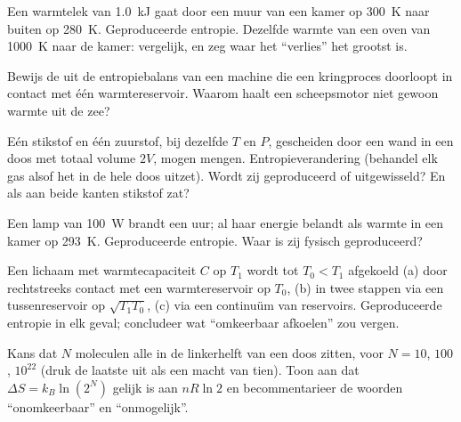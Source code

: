 \begin{exercise}[$\star\star$]\label{exo:b1:second-law-entropy:7}
Een warmtelek van \qty{1.0}{kJ} gaat door een muur van een kamer op \qty{300}{K} naar
buiten op \qty{280}{K}. Geproduceerde entropie. Dezelfde warmte van een oven
van \qty{1000}{K} naar de kamer: vergelijk, en zeg waar het ``verlies'' het
grootst is.
\end{exercise}

\begin{exercise}[$\star\star$]\label{exo:b1:second-law-entropy:8}
Bewijs de  uit de entropiebalans van een machine die een
kringproces doorloopt in contact met één warmtereservoir. Waarom haalt een scheepsmotor
niet gewoon warmte uit de zee?
\end{exercise}

\begin{exercise}[$\star\star$]\label{exo:b1:second-law-entropy:9}
Eén  stikstof en één  zuurstof, bij dezelfde $T$ en $P$,
gescheiden door een wand in een doos met totaal volume $2V$, mogen mengen.
Entropieverandering (behandel elk gas alsof het in de hele doos uitzet). Wordt zij
geproduceerd of uitgewisseld? En als aan beide kanten stikstof zat?
\end{exercise}

\begin{exercise}[$\star\star\star$]\label{exo:b1:second-law-entropy:10}
Een lamp van \qty{100}{W} brandt een uur; al haar energie belandt als warmte in
een kamer op \qty{293}{K}. Geproduceerde entropie. Waar is zij fysisch
geproduceerd?
\end{exercise}

\begin{exercise}[$\star\star\star$]\label{exo:b1:second-law-entropy:11}
Een lichaam met warmtecapaciteit $C$ op $T_1$ wordt tot $T_0 < T_1$ afgekoeld (a) door
rechtstreeks contact met een warmtereservoir op $T_0$, (b) in twee stappen via een
tussenreservoir op $\sqrt{T_1T_0}$, (c) via een continuüm van
reservoirs. Geproduceerde entropie in elk geval; concludeer wat
``omkeerbaar afkoelen'' zou vergen.
\end{exercise}

\begin{exercise}[$\star\star\star$]\label{exo:b1:second-law-entropy:12}
Kans dat $N$ moleculen alle in de linkerhelft van een doos zitten, voor
$N = 10$, $100$, $10^{22}$ (druk de laatste uit als een macht van tien). Toon aan dat
$\Delta S = k_B\ln(2^N)$ gelijk is aan $nR\ln2$ en becommentarieer de woorden
``onomkeerbaar'' en ``onmogelijk''.
\end{exercise}

